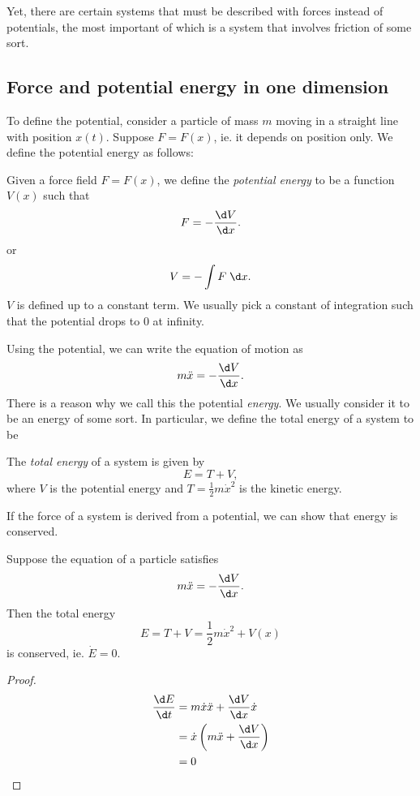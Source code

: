 \documentclass[a4paper]{article}
\begin{document}
Yet, there are certain systems that must be described with forces instead of potentials, the most important of which is a system that involves friction of some sort.

\subsection{Force and potential energy in one dimension}
To define the potential, consider a particle of mass $m$ moving in a straight line with position $x(t)$. Suppose $F = F(x)$, ie. it depends on position only. We define the potential energy as follows:
\begin{defi}
  Given a force field $F = F(x)$, we define the \emph{potential energy} to be a function $V(x)$ such that
  \[
    F = -\frac{\d V}{\d x}.
  \]
  or
  \[
    V = -\int F \;\d x.
  \]
  $V$ is defined up to a constant term. We usually pick a constant of integration such that the potential drops to $0$ at infinity.
\end{defi}
Using the potential, we can write the equation of motion as
\[
  m\ddot{x} = -\frac{\d V}{\d x}.
\]
There is a reason why we call this the potential \emph{energy}. We usually consider it to be an energy of some sort. In particular, we define the total energy of a system to be
\begin{defi}
  The \emph{total energy} of a system is given by
  \[
    E = T + V,
  \]
  where $V$ is the potential energy and $T = \frac{1}{2}m\dot{x}^2$ is the kinetic energy.
\end{defi}
If the force of a system is derived from a potential, we can show that energy is conserved.
\begin{prop}
  Suppose the equation of a particle satisfies
  \[
    m\ddot{x} = -\frac{\d V}{\d x}.
  \]
  Then the total energy
  \[
    E = T + V = \frac{1}{2} m\dot{x}^2 + V(x)
  \]
  is conserved, ie. $\dot{E} = 0$.
\end{prop}

\begin{proof}
  \begin{align*}
    \frac{\d E}{\d t} &= m\dot{x}\ddot{x} + \frac{\d V}{\d x}\dot{x}\\
    &= \dot{x}\left(m\ddot{x} + \frac{\d V}{\d x}\right)\\
    &= 0
  \end{align*}
\end{proof}
\end{document}

